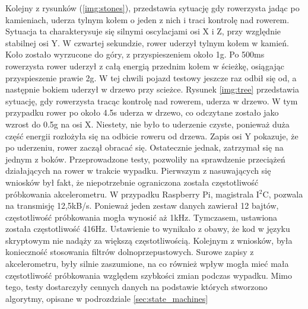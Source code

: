 \newline
\newline
Kolejny z rysunków (\ref{img:stones}), przedstawia sytuację gdy rowerzysta jadąc po kamieniach, uderza tylnym kołem o jeden z nich i traci kontrolę nad rowerem. Sytuacja ta charakterysuje się silnymi oscylacjami osi X i Z, przy względnie stabilnej osi Y. W czwartej sekundzie, rower uderzył tylnym kołem w kamień. Koło zostało wyrzucone do góry, z przyspieszeniem około 1g. Po 500ms rowerzysta rower uderzył z całą energią przednim kołem w ścieżkę, osiągając przyspieszenie prawie 2g. W tej chwili pojazd testowy jeszcze raz odbił się od, a następnie bokiem uderzył w drzewo przy scieżce.
\newline
\newline
Rysunek \ref{img:tree} przedstawia sytuację, gdy rowerzysta tracąc kontrolę nad rowerem, uderza w drzewo. W tym przypadku rower po około 4.5s uderza w drzewo, co odczytane zostało jako wzrost do 0.5g na osi X. Niestety, nie było to uderzenie czyste, ponieważ duża część energii rozłożyła się na odbicie roweru od drzewa. Zapis osi Y pokazuje, że po uderzeniu, rower zaczął obracać się. Ostatecznie jednak, zatrzymał się na jednym z boków.
\newline
\newline
Przeprowadzone testy, pozwoliły na sprawdzenie przeciążeń działających na rower w trakcie wypadku. Pierwszym z nasuwających się wniosków był fakt, że niepotrzebnie ograniczona została częstotliwość próbkowania akcelerometru. W przypadku Raspberry Pi, magistrala I$^{2}$C, pozwala na transmisję 12,5kB/s. Ponieważ jeden zestaw danych zawierał 12 bajtów, częstotliwość próbkowania mogła wynosić aż 1kHz. Tymczasem, ustawiona została częstotliwość 416Hz. Ustawienie to wynikało z obawy, że kod w języku skryptowym nie nadąży za większą częstotliwością. Kolejnym z wniosków, była konieczność stosowania filtrów dolnoprzepustowych. Surowe zapisy z akcelerometru, były silnie zaszumione, na co również wpływ mogła mieć mała częstotliwość próbkowania względem szybkości zmian podczas wypadku. Mimo tego, testy dostarczyły cennych danych na podstawie których stworzono algorytmy, opisane w podrozdziale \ref{sec:state_machines}

